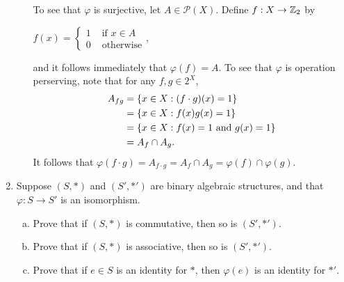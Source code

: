 \documentclass[11pt,fleqn,dvipsnames,usenames]{article}
\begin{document}
\begin{enumerate}[1.]
\begin{enumerate}[(a)]
To see that $\varphi$ is surjective, let $A\in \mathcal{P}(X)$.  Define $f:X\to\mathbb{Z}_{2}$ by
\begin{center}
$f(x) = \begin{cases}1 & \text{ if }x\in A\\0 & \text{ otherwise}\end{cases}$,
\end{center}
and it follows immediately that $\varphi(f) = A$.  To see that $\varphi$ is operation perserving, note that for any $f,g\in 2^{X}$,
\begin{align*}
A_{fg} &= \left\{x\in X:(f\cdot g)(x) = 1\right\}\\ &= \left\{x\in X:f(x)g(x) = 1\right\}\\ &= \left\{x\in X:f(x) = 1\text{ and }g(x) =1\right\}\\
&= A_{f}\cap A_{g}.
\end{align*}
It follows that $\varphi(f\cdot g) = A_{f\cdot g} = A_{f}\cap A_{g} = \varphi(f)\cap \varphi(g)$.
\end{enumerate}

\item Suppose $(S,*)$ and $(S',*')$ are binary algebraic structures, and that $\varphi:S\to S'$ is an isomorphism.
\begin{enumerate}[(a)]
\item Prove that if $(S,*)$ is commutative, then so is $(S',*')$.
\item Prove that if $(S,*)$ is associative, then so is $(S',*')$.
\item Prove that if $e\in S$ is an identity for $*$, then $\varphi(e)$ is an identity for $*'$.
\end{enumerate}
\vsmsp


\end{enumerate}
\end{document}

